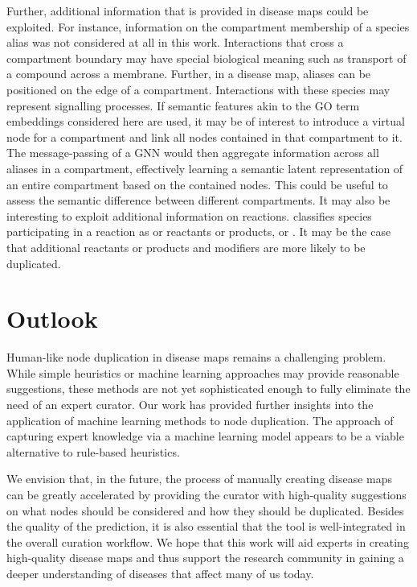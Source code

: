 \documentclass[
	fontsize=10pt, %
	twoside=true, %
	secnumdepth=1, %
  toc=indentunnumbered %
]{kaobook}
\begin{document}
Further,
additional information that is provided in disease maps could be exploited. For
instance, information on the compartment membership of a species alias was not
considered at all in this work. Interactions that cross a compartment boundary
may have special biological meaning such as transport of a compound across a
membrane. Further, in a disease map, aliases can be positioned on the edge of a
compartment. Interactions with these species may represent signalling processes.
%
If semantic features akin to the GO term embeddings considered here are used, it
may be of interest to introduce a virtual node for a compartment and link all
nodes contained in that compartment to it. The message-passing of a GNN would
then aggregate information across all aliases in a compartment, effectively
learning a semantic latent representation of an entire compartment based on the
contained nodes. This could be useful to assess the semantic difference between
different compartments. It may also be interesting to exploit additional
information on reactions. 
classifies species participating in a reaction as  or 
reactants or products, or . It may be the case that additional
reactants or products and modifiers are more likely to be duplicated.
%


\section{Outlook}

Human-like node duplication in disease maps remains a challenging problem. While
simple heuristics or machine learning approaches may provide reasonable
suggestions, these methods are not yet sophisticated enough to fully eliminate
the need of an expert curator. Our work has provided further insights into the
application of machine learning methods to node duplication. The
approach of capturing expert knowledge via a machine learning model appears to
be a viable alternative to rule-based heuristics.

We envision that, in the future, the process of manually creating disease maps
can be greatly accelerated by providing the curator with high-quality
suggestions on what nodes should be considered and how they should be
duplicated. Besides the quality of the prediction, it is also essential that the
tool is well-integrated in the overall curation workflow. We hope that this work
will aid experts in creating high-quality disease maps and thus support the
research community in gaining a deeper understanding of diseases that affect
many of us today.
\end{document}
